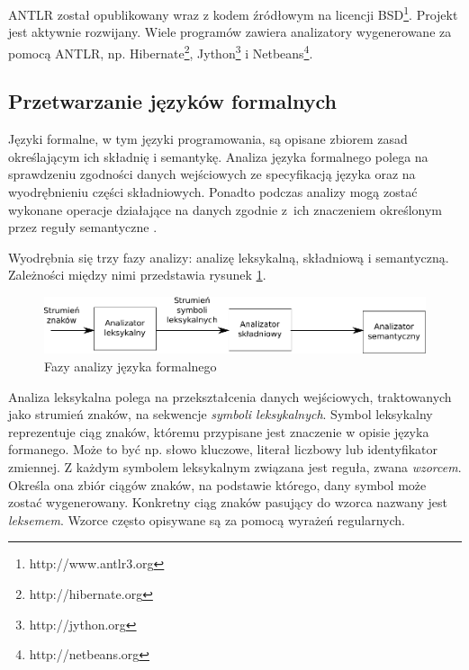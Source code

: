 ANTLR został opublikowany wraz z kodem źródłowym na licencji BSD\footnote{http://www.antlr3.org}. 
Projekt jest
aktywnie rozwijany. Wiele programów zawiera analizatory wygenerowane za pomocą
ANTLR, np. Hibernate\footnote{http://hibernate.org}, Jython\footnote{http://jython.org}
i Netbeans\footnote{http://netbeans.org}.

\subsection{Przetwarzanie języków formalnych}
Języki formalne, w tym języki programowania, są opisane zbiorem zasad określającym
ich składnię i semantykę. Analiza języka formalnego polega na sprawdzeniu zgodności
danych wejściowych ze specyfikacją języka oraz na wyodrębnieniu części składniowych.
Ponadto podczas analizy mogą zostać wykonane operacje działające na danych zgodnie
z~ich znaczeniem określonym przez reguły semantyczne \cite{compilers}.

Wyodrębnia się trzy fazy analizy: analizę leksykalną, składniową i semantyczną. 
Zależności między nimi przedstawia rysunek \ref{antlr_phases}. 


\begin{figure}[h]
  \centering
    \includegraphics[width=\textwidth]{img/antlr_phases.pdf}
    \caption{Fazy analizy języka formalnego}
    \label{antlr_phases}
\end{figure}


Analiza leksykalna polega na przekształcenia danych wejściowych, traktowanych jako 
strumień znaków, na sekwencje \emph{symboli leksykalnych}. Symbol leksykalny reprezentuje
ciąg znaków, któremu przypisane jest znaczenie w opisie języka formanego. Może to 
być np. słowo kluczowe, literał liczbowy lub identyfikator zmiennej.
Z każdym symbolem leksykalnym związana jest reguła, zwana \emph{wzorcem}. Określa ona
zbiór ciągów znaków, na podstawie którego, dany symbol może zostać wygenerowany.
Konkretny ciąg znaków pasujący do wzorca nazwany jest \emph{leksemem}.
Wzorce często opisywane są za pomocą wyrażeń regularnych.

